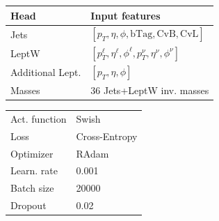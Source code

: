 \begin{figure}[H]
\begin{minipage}{0.58\linewidth}
\begin{table}[H]
    \centering
    \fontsize{11.8pt}{11.8pt}\selectfont
    \begin{tabular}{l|l}
    \toprule
        \textbf{Head} & \textbf{Input features} \\
    \midrule
         Jets & $[p_T,\eta,\phi,\text{bTag},\text{CvB},\text{CvL}]$ \\
         \midrule
         LeptW & $[p_T^\ell,\eta^\ell,\phi^\ell,p_T^\nu,\eta^\nu,\phi^\nu]$\\
         \midrule
         Additional Lept.& $[p_T,\eta,\phi]$ \\
         \midrule
         Masses & 36 Jets+LeptW inv. masses\\
         \bottomrule
    \end{tabular}
    \label{tab:sbanet_inputs}
\end{table}
\end{minipage}
\hfill
\begin{minipage}{0.4\linewidth}
    \begin{table}[H]
    \centering
    \begin{tabular}{l|l}
    \toprule
        Act. function & Swish\\
        Loss& Cross-Entropy\\
        Optimizer & RAdam \\
        Learn. rate & 0.001\\
        Batch size & 20000\\
        Dropout  & 0.02\\  
        \bottomrule
    \end{tabular}
\end{table}
\end{minipage}
\end{figure}

